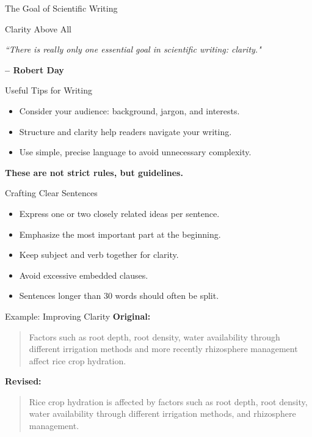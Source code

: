 \begin{frame}{The Goal of Scientific Writing}
  \begin{block}{Clarity Above All}
    \begin{center}
      \Large \itshape ``There is really only one essential goal in scientific writing: clarity."
    \end{center}
    \vspace{0.3cm}
    \hfill \textbf{– Robert Day} \cite{Dixon2020}
  \end{block}
\end{frame}

\begin{frame}{Useful Tips for Writing}
  \begin{itemize}
    \item Consider your audience: background, jargon, and interests. \pause
    \item Structure and clarity help readers navigate your writing. \pause
    \item Use simple, precise language to avoid unnecessary complexity.
  \end{itemize}
  \vspace{0.5cm}
  \alert{\textbf{These are not strict rules, but guidelines.}}
\end{frame}

\begin{frame}{Crafting Clear Sentences}
  \begin{itemize}
    \item Express one or two closely related ideas per sentence. \pause
    \item Emphasize the most important part at the beginning. \pause
    \item Keep subject and verb together for clarity. \pause
    \item Avoid excessive embedded clauses. \pause
    \item Sentences longer than 30 words should often be split.
  \end{itemize}
\end{frame}

\begin{frame}{Example: Improving Clarity}
  \textbf{Original:}
  \vspace{0.3cm}
  \begin{quote}
    Factors such as root depth, root density, water availability through
    different irrigation methods and more recently rhizosphere management affect
    rice crop hydration.
  \end{quote} \pause
  \vspace{0.5cm}
  \textbf{\textcolor{primary}{Revised:}}
  \begin{quote}
    Rice crop hydration is affected by factors such as root depth, root density,
    water availability through different irrigation methods, and rhizosphere
    management.
  \end{quote}
\end{frame}

